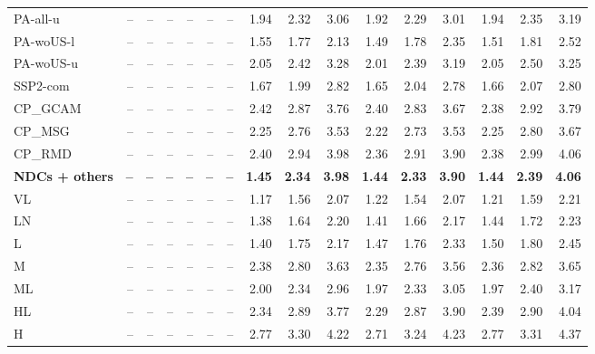 \begin{table}[tp]
{\begin{tabular}{lrrrrrrrrrrrrrrr}
\textcolor[HTML]{006d77}{PA-all-u} & -- & -- & -- & -- & -- & -- & 1.94 & 2.32 & 3.06 & 1.92 & 2.29 & 3.01 & 1.94 & 2.35 & 3.19 \\
\textcolor[HTML]{8ab17d}{PA-woUS-l} & -- & -- & -- & -- & -- & -- & 1.55 & 1.77 & 2.13 & 1.49 & 1.78 & 2.35 & 1.51 & 1.81 & 2.52 \\
\textcolor[HTML]{52796f}{PA-woUS-u} & -- & -- & -- & -- & -- & -- & 2.05 & 2.42 & 3.28 & 2.01 & 2.39 & 3.19 & 2.05 & 2.50 & 3.25 \\
\textcolor[HTML]{c87828}{SSP2-com} & -- & -- & -- & -- & -- & -- & 1.67 & 1.99 & 2.82 & 1.65 & 2.04 & 2.78 & 1.66 & 2.07 & 2.80 \\
\textcolor[HTML]{8a4b2a}{CP\_GCAM} & -- & -- & -- & -- & -- & -- & 2.42 & 2.87 & 3.76 & 2.40 & 2.83 & 3.67 & 2.38 & 2.92 & 3.79 \\
\textcolor[HTML]{b6652d}{CP\_MSG} & -- & -- & -- & -- & -- & -- & 2.25 & 2.76 & 3.53 & 2.22 & 2.73 & 3.53 & 2.25 & 2.80 & 3.67 \\
\textcolor[HTML]{d4883a}{CP\_RMD} & -- & -- & -- & -- & -- & -- & 2.40 & 2.94 & 3.98 & 2.36 & 2.91 & 3.90 & 2.38 & 2.99 & 4.06 \\
\midrule
\textbf{NDCs + others} & \textbf{--} & \textbf{--} & \textbf{--} & \textbf{--} & \textbf{--} & \textbf{--} & \textbf{1.45} & \textbf{2.34} & \textbf{3.98} & \textbf{1.44} & \textbf{2.33} & \textbf{3.90} & \textbf{1.44} & \textbf{2.39} & \textbf{4.06} \\
\midrule
\textcolor[HTML]{bddcf4}{VL} & -- & -- & -- & -- & -- & -- & 1.17 & 1.56 & 2.07 & 1.22 & 1.54 & 2.07 & 1.21 & 1.59 & 2.21 \\
\textcolor[HTML]{a9cce9}{LN} & -- & -- & -- & -- & -- & -- & 1.38 & 1.64 & 2.20 & 1.41 & 1.66 & 2.17 & 1.44 & 1.72 & 2.23 \\
\textcolor[HTML]{93bbe0}{L} & -- & -- & -- & -- & -- & -- & 1.40 & 1.75 & 2.17 & 1.47 & 1.76 & 2.33 & 1.50 & 1.80 & 2.45 \\
\textcolor[HTML]{7ba5d4}{M} & -- & -- & -- & -- & -- & -- & 2.38 & 2.80 & 3.63 & 2.35 & 2.76 & 3.56 & 2.36 & 2.82 & 3.65 \\
\textcolor[HTML]{4c6fb8}{ML} & -- & -- & -- & -- & -- & -- & 2.00 & 2.34 & 2.96 & 1.97 & 2.33 & 3.05 & 1.97 & 2.40 & 3.17 \\
\textcolor[HTML]{6282be}{HL} & -- & -- & -- & -- & -- & -- & 2.34 & 2.89 & 3.77 & 2.29 & 2.87 & 3.90 & 2.39 & 2.90 & 4.04 \\
\textcolor[HTML]{3b0f70}{H} & -- & -- & -- & -- & -- & -- & 2.77 & 3.30 & 4.22 & 2.71 & 3.24 & 4.23 & 2.77 & 3.31 & 4.37 \\

\end{tabular}}
\end{table}
